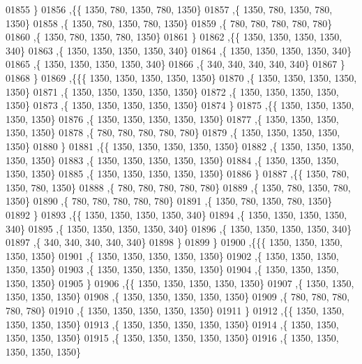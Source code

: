 \begin{DoxyCode}
01855    \}
01856   ,\{\{  1350,   780,  1350,   780,  1350\}
01857    ,\{  1350,   780,  1350,   780,  1350\}
01858    ,\{  1350,   780,  1350,   780,  1350\}
01859    ,\{   780,   780,   780,   780,   780\}
01860    ,\{  1350,   780,  1350,   780,  1350\}
01861    \}
01862   ,\{\{  1350,  1350,  1350,  1350,   340\}
01863    ,\{  1350,  1350,  1350,  1350,   340\}
01864    ,\{  1350,  1350,  1350,  1350,   340\}
01865    ,\{  1350,  1350,  1350,  1350,   340\}
01866    ,\{   340,   340,   340,   340,   340\}
01867    \}
01868   \}
01869  ,\{\{\{  1350,  1350,  1350,  1350,  1350\}
01870    ,\{  1350,  1350,  1350,  1350,  1350\}
01871    ,\{  1350,  1350,  1350,  1350,  1350\}
01872    ,\{  1350,  1350,  1350,  1350,  1350\}
01873    ,\{  1350,  1350,  1350,  1350,  1350\}
01874    \}
01875   ,\{\{  1350,  1350,  1350,  1350,  1350\}
01876    ,\{  1350,  1350,  1350,  1350,  1350\}
01877    ,\{  1350,  1350,  1350,  1350,  1350\}
01878    ,\{   780,   780,   780,   780,   780\}
01879    ,\{  1350,  1350,  1350,  1350,  1350\}
01880    \}
01881   ,\{\{  1350,  1350,  1350,  1350,  1350\}
01882    ,\{  1350,  1350,  1350,  1350,  1350\}
01883    ,\{  1350,  1350,  1350,  1350,  1350\}
01884    ,\{  1350,  1350,  1350,  1350,  1350\}
01885    ,\{  1350,  1350,  1350,  1350,  1350\}
01886    \}
01887   ,\{\{  1350,   780,  1350,   780,  1350\}
01888    ,\{   780,   780,   780,   780,   780\}
01889    ,\{  1350,   780,  1350,   780,  1350\}
01890    ,\{   780,   780,   780,   780,   780\}
01891    ,\{  1350,   780,  1350,   780,  1350\}
01892    \}
01893   ,\{\{  1350,  1350,  1350,  1350,   340\}
01894    ,\{  1350,  1350,  1350,  1350,   340\}
01895    ,\{  1350,  1350,  1350,  1350,   340\}
01896    ,\{  1350,  1350,  1350,  1350,   340\}
01897    ,\{   340,   340,   340,   340,   340\}
01898    \}
01899   \}
01900  ,\{\{\{  1350,  1350,  1350,  1350,  1350\}
01901    ,\{  1350,  1350,  1350,  1350,  1350\}
01902    ,\{  1350,  1350,  1350,  1350,  1350\}
01903    ,\{  1350,  1350,  1350,  1350,  1350\}
01904    ,\{  1350,  1350,  1350,  1350,  1350\}
01905    \}
01906   ,\{\{  1350,  1350,  1350,  1350,  1350\}
01907    ,\{  1350,  1350,  1350,  1350,  1350\}
01908    ,\{  1350,  1350,  1350,  1350,  1350\}
01909    ,\{   780,   780,   780,   780,   780\}
01910    ,\{  1350,  1350,  1350,  1350,  1350\}
01911    \}
01912   ,\{\{  1350,  1350,  1350,  1350,  1350\}
01913    ,\{  1350,  1350,  1350,  1350,  1350\}
01914    ,\{  1350,  1350,  1350,  1350,  1350\}
01915    ,\{  1350,  1350,  1350,  1350,  1350\}
01916    ,\{  1350,  1350,  1350,  1350,  1350\}

\end{DoxyCode}
